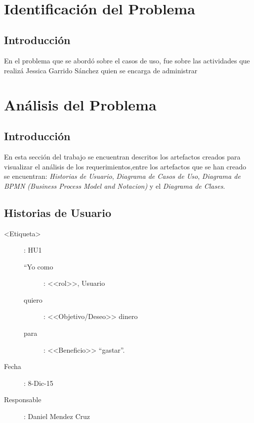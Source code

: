 \documentclass{report}
\makeatletter
\let\thedate\@date
\makeatother
\begin{document}
\begin{titlepage}
	{\large \thedate}\\[2 cm]
 
	\vfill
	
\end{titlepage}


\tableofcontents
\pagebreak

\chapter{Identificación del Problema}
    
    \section{Introducción}

En el problema que se abordó sobre el casos de uso, fue sobre las actividades que realizá Jessica Garrido Sánchez quien se encarga de administrar 

\chapter{Análisis del Problema}

    \section{Introducción}
    En esta sección del trabajo se encuentran descritos los artefactos creados para visualizar el análisis de los requerimientos,entre los artefactos que se han creado se encuentran: \emph{Historias de Usuario}, \emph{Diagrama de Casos de Uso}, \emph{Diagrama de BPMN (Business Process Model and Notacion)} y el \emph{Diagrama de Clases}.    
    
    \section{Historias de Usuario}
    
    \begin{description}
        \item[<Etiqueta>]: HU1
        \begin{description}
            \item[``Yo como]: <<rol>>, Usuario
            \item[quiero]: <<Objetivo/Deseo>> dinero
            \item[para]: <<Beneficio>> ``gastar''.
        \end{description}
        \item[Fecha]: 8-Dic-15
        \item[Responsable]: Daniel Mendez Cruz
    \end{description}
    
\end{document}
